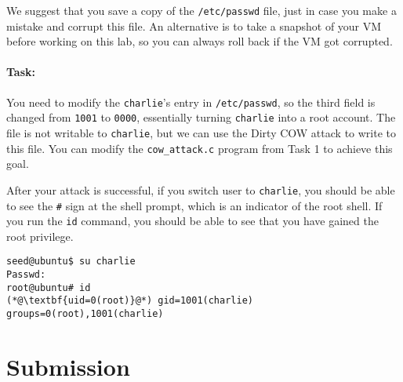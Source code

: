 We suggest that you save a copy of the \texttt{/etc/passwd} file, just in case you 
make a mistake and corrupt this file. An alternative is to take a snapshot of your VM before
working on this lab, so you can always roll back if the VM got corrupted. 



\paragraph{Task:} You need to modify the \texttt{charlie}'s entry in
\texttt{/etc/passwd}, so the third field is changed from \texttt{1001} to 
\texttt{0000}, essentially turning \texttt{charlie} into a root account. 
The file is not writable to \texttt{charlie}, but we can use 
the Dirty COW attack to write to this file. You can  
modify the \texttt{cow\_attack.c} program from Task 1 to achieve 
this goal. 

After your attack is successful, if you switch user to \texttt{charlie}, you should be able to see the 
\texttt{\#} sign at the shell prompt, which is an indicator of the root shell. If you 
run the \texttt{id} command, you should be able to see that you have gained the root privilege. 

\begin{lstlisting}
seed@ubuntu$ su charlie
Passwd: 
root@ubuntu# id
(*@\textbf{uid=0(root)}@*) gid=1001(charlie) groups=0(root),1001(charlie)
\end{lstlisting}
 


\section{Submission}

\seedsubmission




